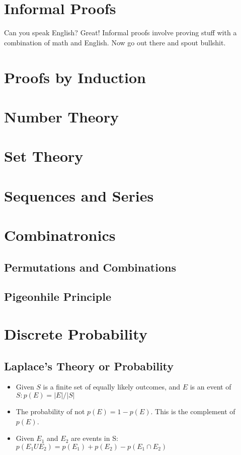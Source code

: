 \documentclass[a4paper]{article}
\begin{document}
\begin{multicols}{2}

	\section{Informal Proofs}
	Can you speak English? Great! Informal proofs involve
	proving stuff with a combination of math and English.
	Now go out there and spout bullshit.

	\section{Proofs by Induction}

	\section{Number Theory}

	\section{Set Theory}

	\section{Sequences and Series}

	\section{Combinatronics}
	\subsection{Permutations and Combinations}
	\subsection{Pigeonhile Principle}

	\section{Discrete Probability}
	\subsection{Laplace's Theory or Probability}
	\begin{itemize}
		\item Given $S$ is a finite set of equally likely outcomes, and $E$ is an event of $S: p(E) = |E|/|S|$
		\item The probability of not $p(E) = 1 - p(E)$. This is the complement of $p(E)$.
		\item Given $E_1$ and $E_2$ are events in S: $p(E_1 U E_2) = p(E_1) + p(E_2) - p(E_1 \cap E_2)$

\end{itemize}
\end{multicols}
\end{document}
